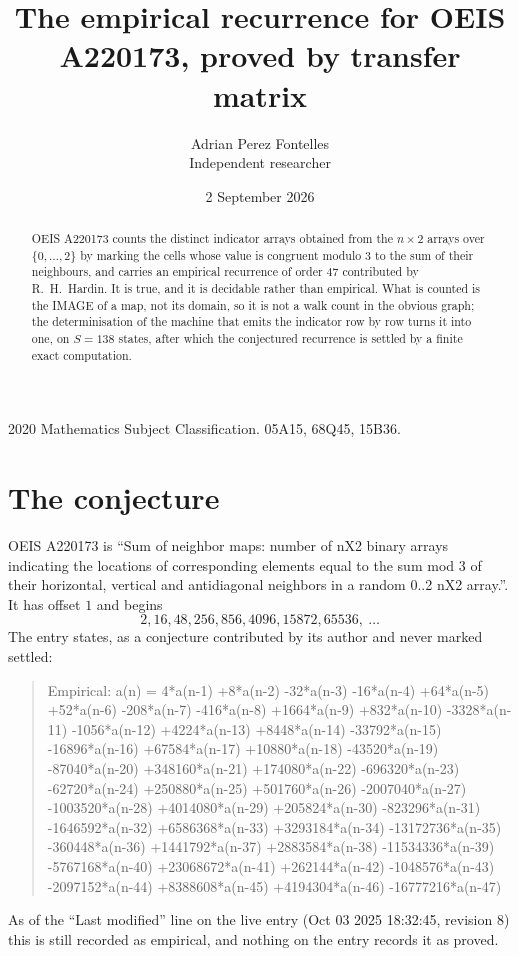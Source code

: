 \documentclass[11pt,a4paper]{article}
\title{The empirical recurrence for OEIS A220173, proved by transfer matrix}
\author{Adrian Perez Fontelles\\ \small Independent researcher}
\date{2 September 2026}
\theoremstyle{plain}
\theoremstyle{definition}
\begin{document}
\maketitle

\begin{abstract}
OEIS A220173 counts the distinct indicator arrays obtained from the $n\times2$ arrays over
$\{0,\dots,2\}$ by marking the cells whose value is congruent modulo 3 to the sum of their neighbours, and carries an
empirical recurrence of order $47$ contributed by R.~H.~Hardin. It is true, and it is
decidable rather than empirical. What is counted is the IMAGE of a map, not its domain, so it
is not a walk count in the obvious graph; the determinisation of the machine that emits the
indicator row by row turns it into one, on $S=138$ states, after which the conjectured
recurrence is settled by a finite exact computation.
\end{abstract}

\noindent\small 2020 Mathematics Subject Classification. 05A15, 68Q45, 15B36.\normalsize

\section{The conjecture}

OEIS A220173 is ``Sum of neighbor maps: number of nX2 binary arrays indicating the locations of corresponding elements equal to the sum mod 3 of their horizontal, vertical and antidiagonal neighbors in a random 0..2 nX2 array.''. It has offset $1$ and begins
\[
2, 16, 48, 256, 856, 4096, 15872, 65536,\ \dots
\]
The entry states, as a conjecture contributed by its author and never marked settled:
\begin{quote}
Empirical: a(n) = 4*a(n-1) +8*a(n-2) -32*a(n-3) -16*a(n-4) +64*a(n-5) +52*a(n-6) -208*a(n-7) -416*a(n-8) +1664*a(n-9) +832*a(n-10) -3328*a(n-11) -1056*a(n-12) +4224*a(n-13) +8448*a(n-14) -33792*a(n-15) -16896*a(n-16) +67584*a(n-17) +10880*a(n-18) -43520*a(n-19) -87040*a(n-20) +348160*a(n-21) +174080*a(n-22) -696320*a(n-23) -62720*a(n-24) +250880*a(n-25) +501760*a(n-26) -2007040*a(n-27) -1003520*a(n-28) +4014080*a(n-29) +205824*a(n-30) -823296*a(n-31) -1646592*a(n-32) +6586368*a(n-33) +3293184*a(n-34) -13172736*a(n-35) -360448*a(n-36) +1441792*a(n-37) +2883584*a(n-38) -11534336*a(n-39) -5767168*a(n-40) +23068672*a(n-41) +262144*a(n-42) -1048576*a(n-43) -2097152*a(n-44) +8388608*a(n-45) +4194304*a(n-46) -16777216*a(n-47)
\end{quote}
As of the ``Last modified'' line on the live entry (Oct 03 2025 18:32:45, revision 8) this is still
recorded as empirical, and nothing on the entry records it as proved.
\end{document}
